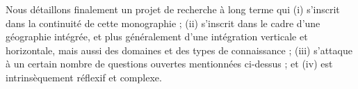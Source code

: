 

Nous détaillons finalement un projet de recherche à long terme qui (i) s'inscrit dans la continuité de cette monographie ; (ii) s'inscrit dans le cadre d'une géographie intégrée, et plus généralement d'une intégration verticale et horizontale, mais aussi des domaines et des types de connaissance ; (iii) s'attaque à un certain nombre de questions ouvertes mentionnées ci-dessus ; et (iv) est intrinsèquement réflexif et complexe.


